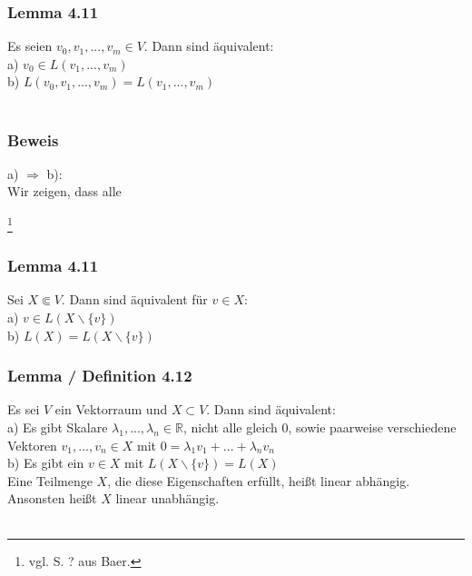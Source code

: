 \documentclass{article}
\begin{document}
\subsubsection*{Lemma 4.11}
Es seien $v_0, v_1, ..., v_m \in V$. Dann sind äquivalent: \\
a) $v_0 \in L(v_1,...,v_m)$ \\
b) $L(v_0, v_1,...,v_m) = L(v_1,...,v_m)$ \\
\\
\subsubsection*{Beweis}
a) $\Rightarrow$ b): \\
Wir zeigen, dass alle 




\newpage
\date{Mittwoch, 08.01.24} \footnote{vgl. S. ? aus Baer.}

\subsubsection*{Lemma 4.11}
Sei $X \Subset V$. Dann sind äquivalent für $v \in X$: \\
a) $v \in L(X\backslash \{v\})$ \\
b) $L(X) = L(X \backslash \{v\})$ \\

\subsubsection*{Lemma / Definition 4.12}
Es sei $V$ ein Vektorraum und $X \subset V$. Dann sind äquivalent: \\
a) Es gibt Skalare $\lambda_1,...,\lambda_n \in \mathbb{R}$, nicht alle gleich $0$, sowie paarweise verschiedene Vektoren $v_1,...,v_n \in X$ mit $0 = \lambda_1 v_1 + ... + \lambda_n v_n$ \\
b) Es gibt ein $v \in X$ mit $L(X\backslash \{v\}) = L(X)$ \\
Eine Teilmenge $X$, die diese Eigenschaften erfüllt, heißt linear abhängig. Ansonsten heißt $X$ linear unabhängig. \\
\\
\end{document}
